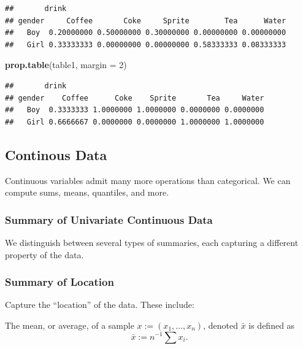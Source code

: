 \documentclass[]{book}
\newenvironment{Shaded}{\begin{snugshade}}{\end{snugshade}}
\newcommand{\KeywordTok}[1]{\textcolor[rgb]{0.13,0.29,0.53}{\textbf{#1}}}
\newcommand{\DataTypeTok}[1]{\textcolor[rgb]{0.13,0.29,0.53}{#1}}
\newcommand{\DecValTok}[1]{\textcolor[rgb]{0.00,0.00,0.81}{#1}}
\newcommand{\NormalTok}[1]{#1}
\theoremstyle{definition}
\theoremstyle{definition}
\theoremstyle{definition}
\theoremstyle{remark}
\let\BeginKnitrBlock\begin \let\EndKnitrBlock\end
\begin{document}
\begin{verbatim}
##       drink
## gender     Coffee       Coke     Sprite        Tea      Water
##   Boy  0.20000000 0.50000000 0.30000000 0.00000000 0.00000000
##   Girl 0.33333333 0.00000000 0.00000000 0.58333333 0.08333333
\end{verbatim}

\begin{Shaded}
\begin{Highlighting}[]
\KeywordTok{prop.table}\NormalTok{(table1, }\DataTypeTok{margin =} \DecValTok{2}\NormalTok{)}
\end{Highlighting}
\end{Shaded}

\begin{verbatim}
##       drink
## gender    Coffee      Coke    Sprite       Tea     Water
##   Boy  0.3333333 1.0000000 1.0000000 0.0000000 0.0000000
##   Girl 0.6666667 0.0000000 0.0000000 1.0000000 1.0000000
\end{verbatim}

\subsection{Continous Data}\label{continous-data}

Continuous variables admit many more operations than categorical. We can
compute sums, means, quantiles, and more.

\subsubsection{Summary of Univariate Continuous
Data}\label{summary-of-univariate-continuous-data}

We distinguish between several types of summaries, each capturing a
different property of the data.

\subsubsection{Summary of Location}\label{summary-of-location}

Capture the ``location'' of the data. These include:

\BeginKnitrBlock{definition}[Average]
\protect\hypertarget{def:unnamed-chunk-98}{}{\label{def:unnamed-chunk-98}
{} }The mean, or average, of a sample
\(x:=(x_1,\dots,x_n)\), denoted \(\bar x\) is defined as
\[ \bar x := n^{-1} \sum x_i. \]
\EndKnitrBlock{definition}
\end{document}
